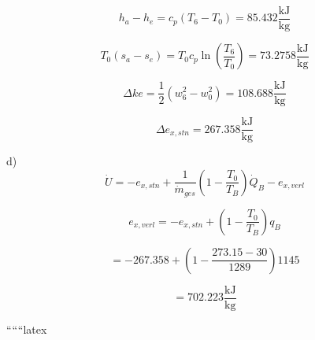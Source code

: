 \[ h_a - h_e = c_p \left( T_6 - T_0 \right) = 85.432 \frac{\text{kJ}}{\text{kg}} \]

\[ T_0 (s_a - s_e) = T_0 c_p \ln \left( \frac{T_6}{T_0} \right) = 73.2758 \frac{\text{kJ}}{\text{kg}} \]

\[ \Delta ke = \frac{1}{2} \left( w_6^2 - w_0^2 \right) = 108.688 \frac{\text{kJ}}{\text{kg}} \]

\[ \Delta e_{x,stn} = 267.358 \frac{\text{kJ}}{\text{kg}} \]

d) \[ \dot{U} = -e_{x,stn} + \frac{1}{\dot{m}_{ges}} \left( 1 - \frac{T_0}{T_B} \right) \dot{Q}_B - e_{x,verl} \]

\[ e_{x,verl} = -e_{x,stn} + \left( 1 - \frac{T_0}{T_B} \right) q_B \]

\[ = -267.358 + \left( 1 - \frac{273.15 - 30}{1289} \right) 1145 \]

\[ = 702.223 \frac{\text{kJ}}{\text{kg}} \]

``````latex


